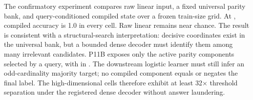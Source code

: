 \markdownRendererDocumentBegin
\markdownRendererSectionBegin
{}\markdownRendererInterblockSeparator
{}The confirmatory experiment compares raw linear input, a fixed universal parity bank, and query-conditioned compiled state over a frozen train-size grid.\markdownRendererInterblockSeparator
{}\markdownRendererInterblockSeparator
{}At , compiled accuracy is 1.0 in every cell. Raw linear remains near chance. The result is consistent with a structural-search interpretation: decisive coordinates exist in the universal bank, but a bounded dense decoder must identify them among many irrelevant candidates.\markdownRendererInterblockSeparator
{}\markdownRendererSectionBegin
{}\markdownRendererInterblockSeparator
{}P11B exposes only the  active parity components selected by a query, with  in . The downstream logistic learner must still infer an odd-cardinality majority target; no compiled component equals or negates the final label.\markdownRendererInterblockSeparator
{}\markdownRendererInterblockSeparator
{}The high-dimensional cells therefore exhibit at least 32× threshold separation under the registered dense decoder without answer laundering.
\markdownRendererSectionEnd 
\markdownRendererSectionEnd \markdownRendererDocumentEnd